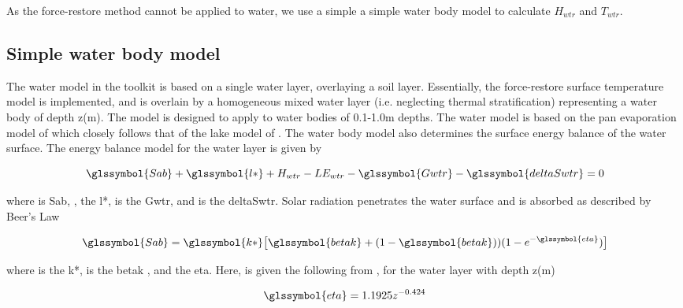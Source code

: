 \documentclass[final,3p,times,authoryear]{elsarticle}
\begin{document}
As the force-restore method cannot be applied to water, we use a simple a simple water body model to calculate $H_{wtr}$ and $T_{wtr}$.


\subsection{Simple water body model}\label{sec:simplewater}


The water model in the toolkit is based on a single water layer, overlaying a soil layer. Essentially, the force-restore surface temperature model is implemented, and is overlain by a homogeneous mixed water layer (i.e. neglecting thermal stratification) representing a water body of depth z(m). The model is designed to apply to water bodies of 0.1-1.0m depths. The water model is based on the pan evaporation model of \cite{MolinaMartinez2006} which closely follows that of the lake model of \cite{Jacobs1998}. The water body model also determines the surface energy balance of the water surface. The energy balance model for the water layer is given by \citep{MolinaMartinez2006}

\begin{equation} 
\glssymbol{Sab} + \glssymbol{l*} + H_{wtr} - LE_{wtr} - \glssymbol{Gwtr} -\glssymbol{deltaSwtr} = 0
\label{eq:sab} \end{equation} 


where  is \glsdesc{Sab}, , the \glsdesc{l*},  is the \glsdesc{Gwtr}, and  is the \glsdesc{deltaSwtr}. Solar radiation penetrates the water surface and is absorbed as described by Beer's Law \citep{MolinaMartinez2006}

\begin{equation} 
\glssymbol{Sab} = \glssymbol{k*} \big[ \glssymbol{betak} + (1 - \glssymbol{betak}) )(1-e^{-\glssymbol{eta}})  \big]
\label{eq:sab2} \end{equation} 

where  is the \glsdesc{k*},  is the \glsdesc{betak} \citep{MolinaMartinez2006}, and  the \glsdesc{eta}. Here,  is given the following from \cite{Subin2012a}, for the water layer with depth z(m)

\begin{equation} 
\glssymbol{eta} = 1.1925z^{-0.424}
\label{eq:eta} \end{equation} 
\end{document}
